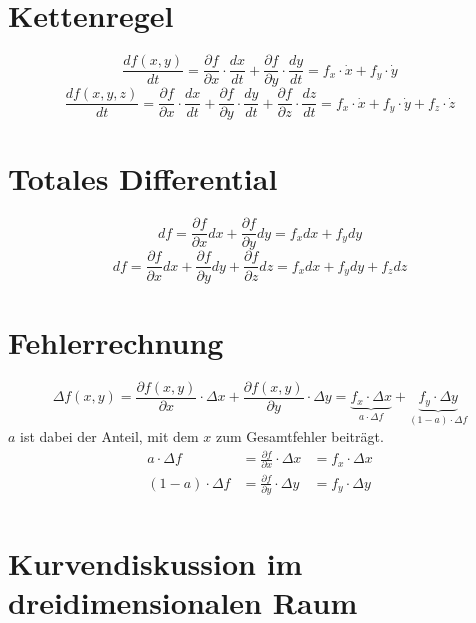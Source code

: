 \section{Kettenregel}
\[ \boxed{\frac{d f(x,y)}{d t} 
= \frac{\partial f}{\partial x} \cdot \frac{d x}{d t} 
+ \frac{\partial f}{\partial y} \cdot \frac{d y}{d t} 
= f_x \cdot \dot{x} + f_y \cdot \dot{y}} \]
\[ \boxed{\frac{d f(x,y,z)}{d t} 
= \frac{\partial f}{\partial x} \cdot \frac{d x}{d t} 
+ \frac{\partial f}{\partial y} \cdot \frac{d y}{d t} 
+ \frac{\partial f}{\partial z} \cdot \frac{d z}{d t} 
= f_x \cdot \dot{x} + f_y \cdot \dot{y} + f_z \cdot \dot{z}} \]

\section{Totales Differential}
\[ \boxed{d f 
= \frac{\partial f}{\partial x} dx + \frac{\partial f}{\partial y} dy 
= f_x dx + f_y dy} \]
\[ \boxed{d f = \frac{\partial f}{\partial x} dx 
+ \frac{\partial f}{\partial y} dy + \frac{\partial f}{\partial z} dz 
= f_x dx + f_y dy + f_z dz} \]

\section{Fehlerrechnung}
\[ \boxed{\Delta f(x,y) = \frac{\partial f(x,y)}{\partial x} \cdot \Delta x 
+ \frac{\partial f(x,y)}{\partial y} \cdot \Delta y 
= \underbrace{f_x \cdot \Delta x}_{a \cdot \Delta f} 
+ \underbrace{f_y \cdot \Delta y}_{(1 - a) \cdot \Delta f}} \]
$a$ ist dabei der Anteil, mit dem $x$ zum Gesamtfehler beiträgt. 
\[ \boxed{\begin{array}{rll}
a \cdot \Delta f        &= \frac{\partial f}{\partial x} \cdot \Delta x 
&= f_x \cdot \Delta x \\
(1 - a) \cdot \Delta f  &= \frac{\partial f}{\partial y} \cdot \Delta y 
&= f_y \cdot \Delta y \\
\end{array}} \]

\section{Kurvendiskussion im dreidimensionalen Raum}

